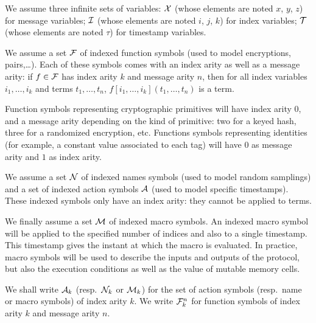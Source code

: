 \medskip

We assume three infinite sets of variables:
$\mathcal{X}$ (whose elements are noted $x$, $y$, $z$) for message variables;
$\mathcal{I}$ (whose elements are noted $i$, $j$, $k$) for index variables;
$\mathcal{T}$ (whose elements are noted $\tau$) for timestamp variables.

We assume a set $\mathcal{F}$ of indexed function symbols
(used to model encryptions, pairs,\dots).
Each of these symbols comes with an index arity as well as a message arity:
if $f\in\mathcal{F}$ has index arity $k$ and message arity $n$,
then for all index variables $i_1,\ldots,i_k$ and terms $t_1,\ldots,t_n$,
$f[i_1,\ldots,i_k](t_1,\ldots,t_n)$ is a term.

\begin{example}
  Function symbols representing cryptographic primitives will have index
  arity $0$, and a message arity depending on the kind of primitive:
  two for a keyed hash, three for a randomized encryption, etc.
  Functions symbols representing identities (for example, a constant value
  associated to each tag) will have $0$ as message arity and $1$ as index arity.
\end{example}

We assume a set $\mathcal{N}$ of indexed names symbols
(used to model random samplings)
and a set of indexed action symbols $\mathcal{A}$
(used to model specific timestamps).
These indexed symbols only have an index arity: they
cannot be applied to terms.

We finally assume a set $\mathcal{M}$ of indexed macro symbols.
An indexed macro symbol will be applied to the specified number of
indices and also to a single timestamp.
This timestamp gives the instant at which the macro is evaluated.
In practice, macro symbols will be used to describe the inputs and outputs
of the protocol, but also the execution conditions as well as the value of
mutable memory cells.

We shall write $\mathcal{A}_k$ (resp.\ $\mathcal{N}_k$ or $\mathcal{M}_k$) for the set of action
symbols (resp.\ name or macro symbols) of index arity $k$.
We write $\mathcal{F}_k^n$ for function symbols of index arity $k$ and message
arity $n$.

